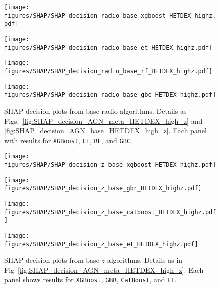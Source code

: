 \documentclass{aa}
\begin{document}
\begin{appendix}
\begin{figure}
  \centering
  \begin{minipage}{0.49\columnwidth}
    \centering
    \texttt{[image: figures/SHAP/SHAP\_decision\_radio\_base\_xgboost\_HETDEX\_highz.pdf]}
  \end{minipage}%
  \hfill
  \begin{minipage}{0.49\columnwidth}
    \centering
    \texttt{[image: figures/SHAP/SHAP\_decision\_radio\_base\_et\_HETDEX\_highz.pdf]}
  \end{minipage}\break%
  \begin{minipage}{0.49\columnwidth}
    \centering
    \texttt{[image: figures/SHAP/SHAP\_decision\_radio\_base\_rf\_HETDEX\_highz.pdf]}
  \end{minipage}%
  \hfill
  \begin{minipage}{0.49\columnwidth}
    \centering
    \texttt{[image: figures/SHAP/SHAP\_decision\_radio\_base\_gbc\_HETDEX\_highz.pdf]}
  \end{minipage}
  \caption{SHAP decision plots from base radio algorithms. Details as Figs.~\ref{fig:SHAP_decision_AGN_meta_HETDEX_high_z} and \ref{fig:SHAP_decision_AGN_base_HETDEX_high_z}. Each panel with results for \texttt{XGBoost}, \texttt{ET}, \texttt{RF}, and \texttt{GBC}.}
  \label{fig:SHAP_decision_radio_base_HETDEX_high_z}
\end{figure}

\begin{figure}
  \centering
  \begin{minipage}{0.49\columnwidth}
    \centering
    \texttt{[image: figures/SHAP/SHAP\_decision\_z\_base\_xgboost\_HETDEX\_highz.pdf]}
  \end{minipage}%
  \hfill
  \begin{minipage}{0.49\columnwidth}
    \centering
    \texttt{[image: figures/SHAP/SHAP\_decision\_z\_base\_gbr\_HETDEX\_highz.pdf]}
  \end{minipage}\break%
  \begin{minipage}{0.49\columnwidth}
    \centering
    \texttt{[image: figures/SHAP/SHAP\_decision\_z\_base\_catboost\_HETDEX\_highz.pdf]}
  \end{minipage}%
  \hfill
  \begin{minipage}{0.49\columnwidth}
    \centering
    \texttt{[image: figures/SHAP/SHAP\_decision\_z\_base\_et\_HETDEX\_highz.pdf]}
  \end{minipage}
  \caption{SHAP decision plots from base $z$ algorithms. Details as in Fig~\ref{fig:SHAP_decision_AGN_meta_HETDEX_high_z}. Each panel shows results for \texttt{XGBoost}, \texttt{GBR}, \texttt{CatBoost}, and \texttt{ET}.}
  \label{fig:SHAP_decision_z_base_HETDEX_high_z}
\end{figure}


\end{appendix}
\end{document}
